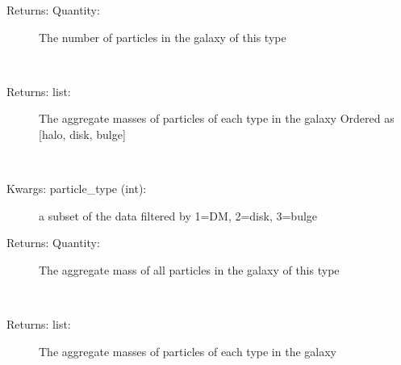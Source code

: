 \documentclass[letterpaper,10pt,english]{sphinxmanual}
\begin{document}
\begin{fulllineitems}
\begin{fulllineitems}
\begin{description}
\item[{Returns: Quantity:}] \leavevmode
The number of particles in the galaxy of this type

\end{description}

\end{fulllineitems}


\begin{fulllineitems}
\label{\detokenize{galaxy:galaxy.galaxy.Galaxy.all_component_counts}}~\begin{description}
\item[{Returns: list:}] \leavevmode
The aggregate masses of particles of each type in the galaxy
Ordered as {[}halo, disk, bulge{]}

\end{description}

\end{fulllineitems}


\begin{fulllineitems}
\label{\detokenize{galaxy:galaxy.galaxy.Galaxy.component_mass}}~\begin{description}
\item[{Kwargs: particle\_type (int):}] \leavevmode
a subset of the data filtered by 1=DM, 2=disk, 3=bulge

\item[{Returns: Quantity:}] \leavevmode
The aggregate mass of all particles in the galaxy of this type

\end{description}

\end{fulllineitems}


\begin{fulllineitems}
\label{\detokenize{galaxy:galaxy.galaxy.Galaxy.all_component_masses}}~\begin{description}
\item[{Returns: list:}] \leavevmode
The aggregate masses of particles of each type in the galaxy


\end{description}
\end{fulllineitems}
\end{fulllineitems}
\end{document}
